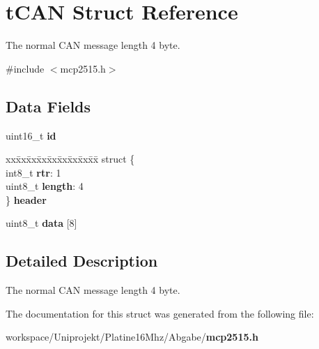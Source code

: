 \section{t\-C\-A\-N \-Struct \-Reference}
\label{structt_c_a_n}


\-The normal \-C\-A\-N message length 4 byte.  




{\ttfamily \#include $<$mcp2515.\-h$>$}

\subsection*{\-Data \-Fields}
\begin{DoxyCompactItemize}
\item 
uint16\-\_\-t {\bfseries id}\label{group__can_ga4fc3a0c58dfbd1e68224521185cb9384}

\item 
\begin{tabbing}
xx\=xx\=xx\=xx\=xx\=xx\=xx\=xx\=xx\=\kill
struct \{\\
\>int8\_t {\bfseries rtr}: 1\\
\>uint8\_t {\bfseries length}: 4\\
\} {\bfseries header}\label{group__can_ga76b6f19e40d69446867ff4650225f0a1}
\\

\end{tabbing}\item 
uint8\-\_\-t {\bfseries data} [8]\label{group__can_gafb87d045bbf32b236fc425efe02bdc7b}

\end{DoxyCompactItemize}


\subsection{\-Detailed \-Description}
\-The normal \-C\-A\-N message length 4 byte. 

\-The documentation for this struct was generated from the following file\-:\begin{DoxyCompactItemize}
\item 
workspace/\-Uniprojekt/\-Platine16\-Mhz/\-Abgabe/{\bf mcp2515.\-h}\end{DoxyCompactItemize}
